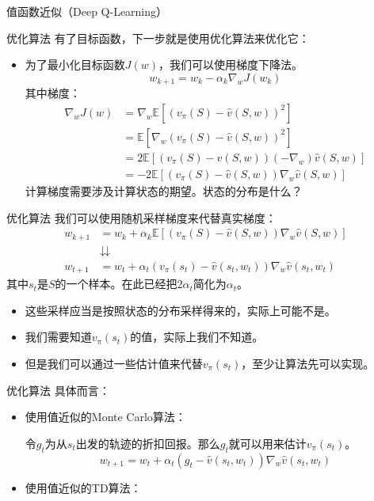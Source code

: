 \begin{section}{值函数近似\alert{（Deep Q-Learning）}}
\begin{frame}{优化算法}
    有了目标函数，下一步就是使用优化算法来优化它：
    \begin{itemize}
        \item 为了最小化目标函数$J(w)$，我们可以使用\alert{梯度下降法}。
        \[
            w_{k+1}=w_k-\alpha_k\nabla_w J(w_k)
        \]
        其中梯度：
        \[
            \begin{aligned}
                \nabla_w J(w)&=\nabla_w\mathbb{E}[(v_\pi(S)-\hat{v}(S,w))^2] \\
                &=\mathbb{E}[\nabla_w(v_\pi(S)-\hat{v}(S,w))^2]\\
                &=2\mathbb{E}[(v_\pi(S)-\hat{v}(S,w))(-\nabla_w)\hat{v}(S,w)]\\
                &=-2\mathbb{E}[(v_\pi(S)-\hat{v}(S,w))\nabla_w\hat{v}(S,w)]
            \end{aligned}
        \]
        计算梯度需要涉及计算状态的期望。状态的分布是什么？
    \end{itemize}
\end{frame}

\begin{frame}{优化算法}
    我们可以使用随机采样梯度来代替真实梯度：
    \[
        \begin{aligned}
            w_{k+1}&=w_k+\alpha_k\mathbb{E}[(v_\pi(S)-\hat{v}(S,w))\nabla_w\hat{v}(S,w)] \\
            &\downdownarrows \\
            w_{t+1}&=w_t+\alpha_t(v_\pi(s_t)-\hat{v}(s_t,w_t))\nabla_w\hat{v}(s_t,w_t)
        \end{aligned}
    \]
    其中$s_t$是$S$的一个样本。在此已经把$2\alpha_t$简化为$\alpha_t$。
    \begin{itemize}
        \item 这些采样应当是按照状态的分布采样得来的，实际上可能不是。
        \item 我们需要知道$v_\pi(s_t)$的值，实际上我们不知道。
        \item 但是我们可以通过一些估计值来代替$v_\pi(s_t)$，至少让算法先可以实现。
    \end{itemize}
\end{frame}

\begin{frame}{优化算法}
    具体而言：
    \begin{itemize}
        \item 使用值近似的Monte Carlo算法：
        
        令$g_t$为从$s_t$出发的轨迹的折扣回报。那么$g_t$就可以用来估计$v_\pi(s_t)$。
        \[
            w_{t+1}=w_t+\alpha_t(g_t-\hat{v}(s_t,w_t))\nabla_w\hat{v}(s_t,w_t)
        \]
        \item 使用值近似的TD算法：
        

\end{itemize}
\end{frame}
\end{section}
